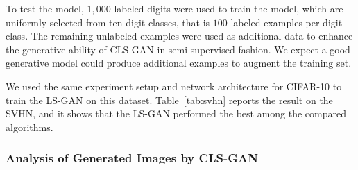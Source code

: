 To test the model, $1,000$ labeled digits were used to train the model, which are uniformly selected from ten digit classes, that is $100$ labeled examples per digit class. The remaining unlabeled examples were used as additional data to enhance the generative ability of CLS-GAN in semi-supervised fashion.
We expect a good generative model could produce additional examples to augment the training set.

We used the same experiment setup and network architecture for CIFAR-10 to train the LS-GAN on this dataset.  Table~\ref{tab:svhn} reports the result on the SVHN, and it shows that the LS-GAN performed the best among the compared algorithms.



\subsubsection{Analysis of Generated Images by CLS-GAN}

